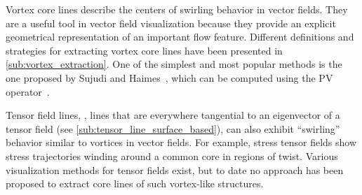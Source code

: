 Vortex core lines describe the centers of swirling behavior in vector fields.
%
They are a useful tool in vector field visualization because they provide an
explicit geometrical representation of an important flow feature.
%
Different definitions and strategies for extracting vortex core lines have been
presented in \cref{sub:vortex_extraction}.
%
One of the simplest and most popular methods is the one proposed by Sujudi and
Haimes~\cite{Sujudi1995}, which can be computed using the \ac{PV}
operator~\cite{Peikert1999}.
%

%
Tensor field lines, \ie, lines that are everywhere tangential to an eigenvector
of a tensor field (see \cref{sub:tensor_line_surface_based}), can also exhibit
``swirling'' behavior similar to vortices in vector fields.
%
For example, stress tensor fields show stress trajectories winding around a
common core in regions of twist.
%
Various visualization methods for tensor fields exist, but to date no approach
has been proposed to extract core lines of such vortex-like structures.
%

